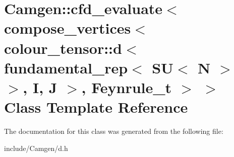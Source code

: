 \hypertarget{a00052}{}\section{Camgen\+:\+:cfd\+\_\+evaluate$<$ compose\+\_\+vertices$<$ colour\+\_\+tensor\+:\+:d$<$ fundamental\+\_\+rep$<$ S\+U$<$ N $>$ $>$, I, J $>$, Feynrule\+\_\+t $>$ $>$ Class Template Reference}
\label{a00052}


The documentation for this class was generated from the following file\+:\begin{DoxyCompactItemize}
\item 
include/\+Camgen/d.\+h\end{DoxyCompactItemize}
